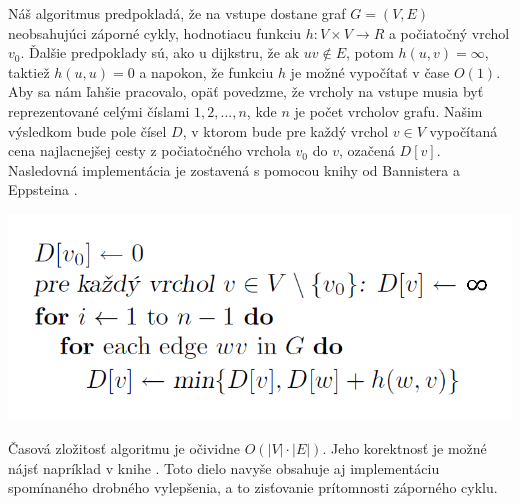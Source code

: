Náš algoritmus predpokladá, že na vstupe dostane graf $G = (V, E)$ neobsahujúci záporné cykly, hodnotiacu funkciu $h: V \times V \rightarrow R$ a počiatočný vrchol $v_{0}$. Ďalšie predpoklady sú, ako u dijkstru, že ak $uv \notin E$, potom $h(u,v) = \infty$, taktiež $h(u,u) = 0$ a napokon, že funkciu $h$ je možné vypočítať v čase $O(1)$. Aby sa nám ľahšie pracovalo, opäť povedzme, že vrcholy na vstupe musia byť reprezentované celými číslami $1, 2, ... , n$, kde $n$ je počet vrcholov grafu. Našim výsledkom bude pole čísel $D$, v ktorom bude pre každý vrchol $v \in V$ vypočítaná cena najlacnejšej cesty z počiatočného vrchola $v_{0}$ do $v$, ozačená $D [v]$. Nasledovná implementácia je zostavená s pomocou knihy od Bannistera a Eppsteina \cite{bannister2012randomized}.\newline

\begin{algorithm}[H]
  \includegraphics[width=\linewidth]{./images/Alg_Bellman-Ford.png}
  \caption{Bellman\textendash Fordov algoritmus}
  \label{Alg_Bellman-Ford}
  \centering
\end{algorithm}

Časová zložitosť algoritmu je očividne $O(|V|\cdot |E|)$. Jeho korektnosť je možné nájsť napríklad v knihe \cite[kapitola 3.3.4]{bang2008digraphs}. Toto dielo navyše obsahuje aj implementáciu spomínaného drobného vylepšenia, a to zisťovanie prítomnosti záporného cyklu.\newline

